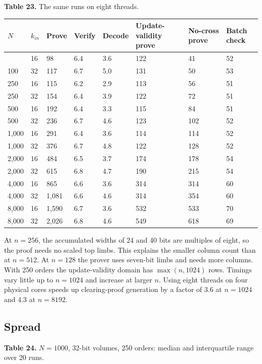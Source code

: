 \textbf{Table 23.} The same runs on eight threads.

\begin{longtable}[]{@{}llllllll@{}}
\toprule\noalign{}
\(N\) & \(k_{in}\) & Prove & Verify & Decode & Update-validity prove & No-cross prove & Batch check \\
\midrule\noalign{}
\endhead
\bottomrule\noalign{}
\endlastfoot
100 & 16 & 98 & 6.4 & 3.6 & 122 & 41 & 52 \\
100 & 32 & 117 & 6.7 & 5.0 & 131 & 50 & 53 \\
250 & 16 & 115 & 6.2 & 2.9 & 113 & 56 & 51 \\
250 & 32 & 154 & 6.4 & 3.9 & 122 & 72 & 51 \\
500 & 16 & 192 & 6.4 & 3.3 & 115 & 84 & 51 \\
500 & 32 & 236 & 6.7 & 4.6 & 123 & 102 & 52 \\
1,000 & 16 & 291 & 6.4 & 3.6 & 114 & 114 & 52 \\
1,000 & 32 & 376 & 6.7 & 4.8 & 122 & 128 & 52 \\
2,000 & 16 & 484 & 6.5 & 3.7 & 174 & 178 & 54 \\
2,000 & 32 & 615 & 6.8 & 4.7 & 190 & 215 & 54 \\
4,000 & 16 & 865 & 6.6 & 3.6 & 314 & 314 & 60 \\
4,000 & 32 & 1,081 & 6.6 & 4.6 & 314 & 354 & 60 \\
8,000 & 16 & 1,590 & 6.7 & 3.6 & 532 & 533 & 70 \\
8,000 & 32 & 2,026 & 6.8 & 4.6 & 549 & 618 & 69 \\
\end{longtable}

At \(n=256\), the accumulated widths of 24 and 40 bits are multiples of eight, so the proof needs no scaled top limbs. This explains the smaller column count than at \(n=512\). At \(n=128\) the prover uses seven-bit limbs and needs more columns. With 250 orders the update-validity domain has \(\max(n,1024)\) rows. Timings vary little up to \(n=1024\) and increase at larger \(n\). Using eight threads on four physical cores speeds up clearing-proof generation by a factor of 3.6 at \(n=1024\) and 4.3 at \(n=8192\).

\subsection{Spread}

\textbf{Table 24.} \(N = 1000\), 32-bit volumes, 250 orders: median and interquartile range over 20 runs.

